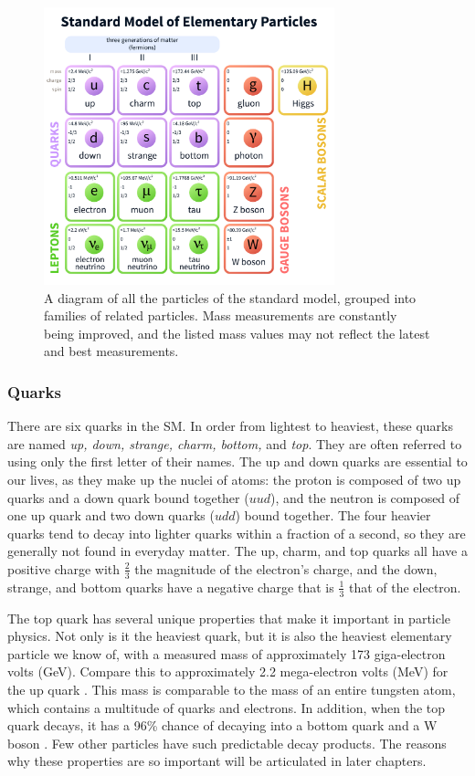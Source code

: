 \begin{figure}[h]
  \centering
  \includegraphics[width=0.75\textwidth]{figures/standard-model-light.pdf}
  \caption%
  {A diagram of all the particles of the standard model, grouped into
  families of related particles. Mass measurements are constantly
  being improved, and the listed mass values may not reflect the latest and
  best measurements.}
  \label{fig:standardmodel}
\end{figure}

\subsubsection*{Quarks}
There are six quarks in the SM. In order from lightest to heaviest,
these quarks are named \emph{up, down, strange, charm, bottom,} and
\emph{top}. They are often referred to using only the first letter of
their names. The up and down quarks are essential to our lives, as
they make up the nuclei of atoms: the proton is composed of two up
quarks and a down quark bound together ($uud$), and the neutron is composed of one up
quark and two down quarks ($udd$) bound together. The four heavier
quarks tend to decay into lighter quarks within a fraction of a
second, so they are generally not found in everyday matter. The up,
charm, and top quarks all have a positive charge with $\frac{2}{3}$ the
magnitude of the electron's charge, and the down, strange, and bottom
quarks have a negative charge that is $\frac{1}{3}$ that of the electron.

The top quark has several unique properties that make it important
in particle physics. Not only is
it the heaviest quark, but it is also the heaviest elementary particle
we know of, with a measured mass of approximately 173 giga-electron
volts (GeV). Compare this to approximately 2.2 mega-electron volts
(MeV) for the up quark \cite{pdg}. This mass is comparable to the mass
of an entire tungsten atom, which contains a multitude of quarks and electrons.
In addition, when the top quark decays, it has a 96\% chance of
decaying into a bottom quark and a W boson \cite{pdg}. Few other
particles have such predictable decay products. The reasons why these
properties are so important will be articulated in later chapters. %

